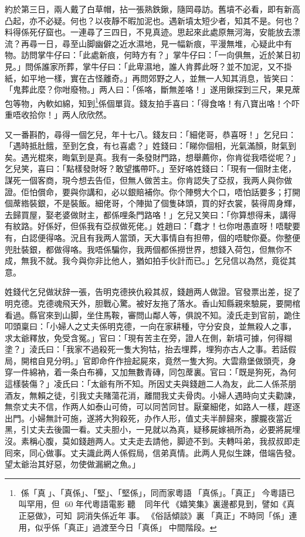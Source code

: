 \documentclass[a5paper, 12pt, openany]{book} %
\begin{document}
	約於第三日，兩人戴了白草帽，拈一張熟鉄鍬，隨岡尋訪。舊墳不必看，即有新高凸起，亦不必疑。何也？以夜靜不暇加泥也。遇新墳太短少者，知其不是。何也？料得係死仔窟也。一連尋了三四日，不見真迹。思起來此處原無河海，安能放去漂流？再尋一日，尋至山脚幽僻之近水濕地，見一幅新痕，平漫無堆，心疑此中有物。訪問掌牛仔曰：「此處新痕，何時方有？」掌牛仔曰：「一向俱無，近於某日初見。」問係誰家所葬，掌牛仔曰：「此卑濕地，誰人肯葬此呀？並不加泥，又不掛紙，如平地一樣，實在古怪離奇。」再問郊野之人，並無一人知其消息，皆笑曰：「鬼葬此麼？你咁廢物。」两人曰：「係咯，斷無差咯！」遂用鍬探到三尺，果見蓆包等物，內軟如綿，知到\footnote{
  係「真󱝚」、「真係」、「堅」、「堅係」，同而家粵語󱝚「真係」。「真正」󱪙今粵語已叫罕用，但󱪙 60 年代粵語電影󱄵聽󰧱，󱪙同年代󱝚《嬉笑集》裏邊都見到，譬如《真正惡做》，可知󰳞詞消失係近年󱝚事。󱪙《俗話傾談》裏󰊺「真正」不時同「係」連用，似乎係「真正」過渡至今日「真係」󱝚中間階段。
}係個單貨。錢友拍手喜曰：「得食咯！有八寶出咯！个吓重唔收拾你！」两人欣欣然。

	又一番斟酌，尋得一個乞兒，年十七八。錢友曰：「細佬哥，恭喜呀！」乞兒曰：「遇時抵肚餓，至到乞食，有乜喜處？」姓錢曰：「睇你個相，光氣滿顏，財氣到矣。遇光棍來，晦氣到是真。我有一条發財門路，想舉薦你，你肯從我唔從呢？」乞兒笑，喜曰：「點樣發財呀？敢望攜帶吓。」至好咯姓錢曰：「現有一個財主佬，謀死一個客商，現今想去告佢，但無人做苦主。你肯認失了亞叔，我两人與你做證。佢怕償命，要與你講和，必以銀賠補你。你个陣劈大个口，唔怕話要多；打開個蓆綹裝銀，不是裝飯。細佬哥，个陣拋了個隻砵頭，買的好衣裳，裝得周身輝，去歸買屋，娶老婆做財主，都係哩条門路咯！」乞兒又笑曰：「你算想得耒，講得有紋路。好係好，但係我有亞叔做死佬。」姓趙曰：「蠢才！乜你咁愚直呀！唔駛要有，白認便得咯。況且有我两人當頭，天大事情自有担帶，個的唔駛你憂。你整便兜肚裝銀，都做得咯。我唔係騙你，我两個都係撈世界，想錢入荷包，但無你不成，無我不就。我今與你非比他人，猶如拍手伙計而已。」乞兒信以為然，竟從其意。

	姓錢代乞兒做狀辞一張，告明克德挾仇殺其叔，錢趙两人做證。官發票出差，捉了明克德。克德魂飛天外，胆戰心驚。被好友拖了落水。香山知縣親來驗屍，要開棺看過。縣官來到山脚，坐住馬鞍，審問山鄰人等，俱說不知。淩氏走到官前，跪住叩頭稟曰：「小婦人之丈夫係明克德，一向在家耕種，守分安良，並無殺人之事，求太爺釋放，免受含冤。」官曰：「現有苦主在旁，證人在側，新墳可據，何得糊塗？」淩氏曰：「我家不過殺死一隻大狗牯，抬去埋葬，埋狗亦古人之事。若話假局，開棺自見分明。」官即命仵作撿起屍來，竟然一隻大狗。大雲鼎堡做頭壳，身穿一件綿衲，着一条白布褲，又加無數青磚，同包蓆裏。官曰：「既是狗死，為何這樣裝傷？」凌氏曰：「太爺有所不知。所因丈夫與錢趙二人為友，此二人係茶朋酒友，無賴之徒，引我丈夫賭蕩花消，離間我丈夫骨肉。小婦人遇時向丈夫勸諫，無奈丈夫不信，作两人如泰山可倚，可以同苦同甘。厭棄細佬，如路人一樣，趕逐出門。小婦無計可施，遂將大狗殺死，办作人形，值丈夫半醉歸來，朦朧夜當近黑，引丈夫去後園一看。丈夫胆小，一見就以為真，疑移屍嫁禍所為，必要將屍埋沒。素稱心腹，莫如錢趙两人。丈夫走去請他，脚迹不到。夫轉呌弟，我叔叔即走囘來，同心做事。丈夫識此两人係假局，信弟真情。此两人見似生踈，借端告發。望太爺治其好惡，勿使做漏網之魚。」
\end{document}
